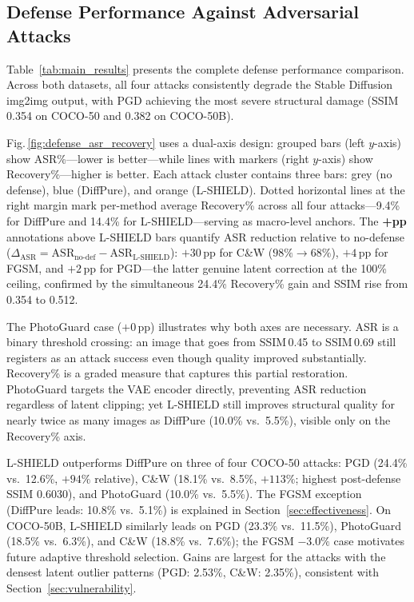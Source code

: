 \documentclass[conference]{IEEEtran}
\begin{document}
\subsection{Defense Performance Against Adversarial Attacks}

Table~\ref{tab:main_results} presents the complete defense performance
comparison. Across both datasets, all four attacks consistently degrade the
Stable Diffusion img2img output, with PGD achieving the most severe structural
damage (SSIM 0.354 on COCO-50 and 0.382 on COCO-50B).


Fig.\,\ref{fig:defense_asr_recovery} uses a dual-axis design: grouped bars
(left $y$-axis) show ASR\%---lower is better---while lines with markers
(right $y$-axis) show Recovery\%---higher is better. Each attack cluster
contains three bars: grey (no defense), blue (DiffPure), and orange (L-SHIELD).
Dotted horizontal lines at the right margin mark per-method average Recovery\%
across all four attacks---9.4\% for DiffPure and 14.4\% for L-SHIELD---serving
as macro-level anchors. The \textbf{+pp} annotations above L-SHIELD bars
quantify ASR reduction relative to no-defense
($\Delta_{\mathrm{ASR}} = \mathrm{ASR}_{\text{no-def}} - \mathrm{ASR}_{\text{L-SHIELD}}$):
$+30$\,pp for C\&W ($98\%{\to}68\%$), $+4$\,pp for FGSM, and $+2$\,pp for
PGD---the latter genuine latent correction at the 100\% ceiling, confirmed by
the simultaneous 24.4\% Recovery\% gain and SSIM rise from 0.354 to 0.512.

The PhotoGuard case ($+0$\,pp) illustrates why both axes are necessary.
ASR is a binary threshold crossing: an image that goes from SSIM\,0.45 to
SSIM\,0.69 still registers as an attack success even though quality improved
substantially. Recovery\% is a graded measure that captures this partial
restoration. PhotoGuard targets the VAE encoder directly, preventing ASR
reduction regardless of latent clipping; yet L-SHIELD still improves structural
quality for nearly twice as many images as DiffPure (10.0\% vs.\ 5.5\%),
visible only on the Recovery\% axis.

L-SHIELD outperforms DiffPure on three of four COCO-50 attacks: PGD
(24.4\% vs.\ 12.6\%, $+94\%$ relative), C\&W (18.1\% vs.\ 8.5\%, $+113\%$;
highest post-defense SSIM 0.6030), and PhotoGuard (10.0\% vs.\ 5.5\%).
The FGSM exception (DiffPure leads: 10.8\% vs.\ 5.1\%) is explained in
Section~\ref{sec:effectiveness}. On COCO-50B, L-SHIELD similarly leads on PGD
(23.3\% vs.\ 11.5\%), PhotoGuard (18.5\% vs.\ 6.3\%), and C\&W (18.8\%
vs.\ 7.6\%); the FGSM $-3.0\%$ case motivates future adaptive threshold
selection. Gains are largest for the attacks with the densest latent outlier
patterns (PGD: 2.53\%, C\&W: 2.35\%), consistent with Section~\ref{sec:vulnerability}.
\end{document}
